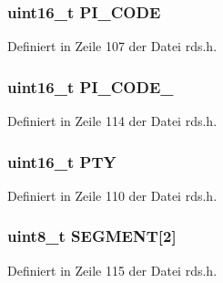 \subsubsection[{P\+I\+\_\+\+C\+O\+D\+E}]{\setlength{\rightskip}{0pt plus 5cm}uint16\+\_\+t P\+I\+\_\+\+C\+O\+D\+E}\label{structgroup__2b_a5cd9b1f6413028425796c1129aa8fd87}


Definiert in Zeile 107 der Datei rds.\+h.

\hypertarget{structgroup__2b_ae86fed9d07832a5c3cc36d5aaa064bcb}{}
\subsubsection[{P\+I\+\_\+\+C\+O\+D\+E\+\_\+2}]{\setlength{\rightskip}{0pt plus 5cm}uint16\+\_\+t P\+I\+\_\+\+C\+O\+D\+E\+\_}\label{structgroup__2b_ae86fed9d07832a5c3cc36d5aaa064bcb}


Definiert in Zeile 114 der Datei rds.\+h.

\hypertarget{structgroup__2b_a0474967478fbbc2c71b800d2e0132d45}{}
\subsubsection[{P\+T\+Y}]{\setlength{\rightskip}{0pt plus 5cm}uint16\+\_\+t P\+T\+Y}\label{structgroup__2b_a0474967478fbbc2c71b800d2e0132d45}


Definiert in Zeile 110 der Datei rds.\+h.

\hypertarget{structgroup__2b_ad4b043906241d98e6b480a31f1438352}{}
\subsubsection[{S\+E\+G\+M\+E\+N\+T}]{\setlength{\rightskip}{0pt plus 5cm}uint8\+\_\+t S\+E\+G\+M\+E\+N\+T\mbox{[}2\mbox{]}}\label{structgroup__2b_ad4b043906241d98e6b480a31f1438352}


Definiert in Zeile 115 der Datei rds.\+h.

\hypertarget{structgroup__2b_ab9e634c63b0d95a96716d5f6d7f06d72}{}
